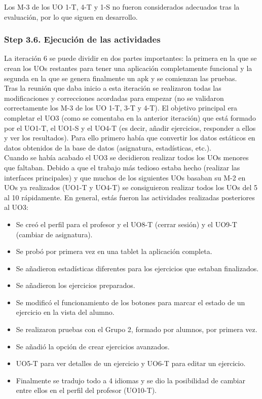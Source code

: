 Los M-3 de los UO 1-T, 4-T y 1-S no fueron considerados adecuados tras la evaluación, por lo que siguen en desarrollo.\\

\subsubsection{Step 3.6. Ejecución de las actividades}
\label{it6:3.6}

La iteración 6 se puede dividir en dos partes importantes: la primera en la que se crean los UOs restantes para tener una aplicación completamente funcional y la segunda en la que se genera finalmente un apk y se comienzan las pruebas.\\

Tras la reunión que daba inicio a esta iteración se realizaron todas las modificaciones y correcciones acordadas para empezar (no se validaron correctamente los M-3 de los UO 1-T, 3-T y 4-T). El objetivo principal era completar el UO3 (como se comentaba en la anterior iteración) que está formado por el UO1-T, el UO1-S y el UO4-T (es decir, añadir ejercicios, responder a ellos y ver los resultados). Para ello primero había que convertir los datos estáticos en datos obtenidos de la base de datos (asignatura, estadísticas, etc.).\\

Cuando se había acabado el UO3 se decidieron realizar todos los UOs menores que faltaban. Debido a que el trabajo más tedioso estaba hecho (realizar las interfaces principales) y que muchos de los siguientes UOs basaban su M-2 en UOs ya realizados (UO1-T y UO4-T) se consiguieron realizar todos los UOs del 5 al 10 rápidamente. En general, estás fueron las actividades realizadas posteriores al UO3:

\begin{itemize}
\item Se creó el perfil para el profesor y el UO8-T (cerrar sesión) y el UO9-T (cambiar de asignatura).
\item Se probó por primera vez en una tablet la aplicación completa.
\item Se añadieron estadísticas diferentes para los ejercicios que estaban finalizados.
\item Se añadieron los ejercicios preparados.
\item Se modificó el funcionamiento de los botones para marcar el estado de un ejercicio en la vista del alumno.
\item Se realizaron pruebas con el Grupo 2, formado por alumnos, por primera vez.
\item Se añadió la opción de crear ejercicios avanzados.
\item UO5-T para ver detalles de un ejercicio y UO6-T para editar un ejercicio.
\item Finalmente se tradujo todo a 4 idiomas y se dio la posibilidad de cambiar entre ellos en el perfil del profesor (UO10-T).
\end{itemize}

